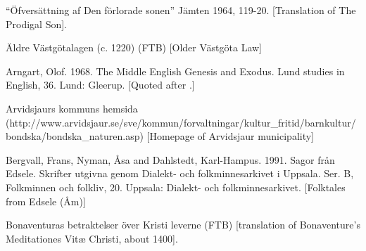 \begin{listWWNumileveli}
\item 

\begin{styleSource}
“Öfversättning af Den förlorade sonen” Jämten 1964, 119-20. [Translation of The Prodigal Son]. 

\end{styleSource}

\item 

\begin{styleSource}
\label{bkm:Ref154219978}Äldre Västgötalagen (c. 1220) (FTB) [Older Västgöta Law]

\end{styleSource}

\item 

\begin{styleSource}
\label{bkm:Ref151372879}Arngart, Olof. 1968. The Middle English Genesis and Exodus. Lund studies in English, 36. Lund: Gleerup. [Quoted after \citet{Allen1997}.]

\end{styleSource}

\item 

\begin{styleSource}
\label{bkm:Ref137879837}Arvidsjaurs kommuns hemsida (http://www.arvidsjaur.se/sve/kommun/forvaltningar/kultur\_fritid/barnkultur/bondska/bondska\_naturen.asp) [Homepage of Arvidsjaur municipality]

\end{styleSource}

\item 

\begin{styleSource}
\label{bkm:Ref150329670}Bergvall, Frans, Nyman, Åsa and Dahlstedt, Karl-Hampus. 1991. Sagor från Edsele. Skrifter utgivna genom Dialekt- och folkminnesarkivet i Uppsala. Ser. B, Folkminnen och folkliv, 20. Uppsala: Dialekt- och folkminnesarkivet. [Folktales from Edsele (Åm)]

\end{styleSource}

\item 

\begin{styleSource}
\label{bkm:Ref154213744}Bonaventuras betraktelser över Kristi leverne (FTB) [translation of Bonaventure’s Meditationes Vitæ Christi, about 1400]. 


\end{styleSource}
\end{listWWNumileveli}
